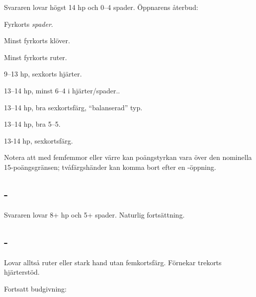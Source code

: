 Svararen lovar högst 14 hp och 0--4 spader. Öppnarens återbud:

\begin{beskriv}
   \item[\NT{1}] Fyrkorts \emph{spader}.
   \item[\kl{2}] Minst fyrkorts klöver.
   \item[\ru{2}] Minst fyrkorts ruter.
   \item[\hj{2}] 9--13 hp, sexkorts hjärter.

   \item[\spa{2}] 13--14 hp, minst 6--4 i hjärter/spader..

   \item[\NT{2}] 13--14 hp, bra sexkortsfärg, ``balanserad'' typ.

   \item[\la{3}] 13--14 hp, bra 5--5.

   \item[\hj{3}] 13-14 hp, sexkortsf{\"a}rg.

\end{beskriv}

Notera att med femfemmor eller värre kan poängstyrkan vara över den
nominella 15-poängsgränsen; tvåfärgshänder kan komma bort efter en
-öppning.

\subsection{ - }

Svararen lovar 8+ hp och 5+ spader. Naturlig fortsättning.

\subsection{ - }

Lovar alltså ruter eller stark hand utan femkortsfärg. Förnekar trekorts
hjärterstöd.

Fortsatt budgivning:

